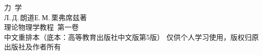 \documentclass[11pt,a4paper,twoside,openright]{ctexbook}
\numberwithin{equation}{section}
\begin{document}
\begin{titlepage}
\thispagestyle{empty}
\centering
\vspace*{3.2cm}
{\heiti 力\ 学}\\[1.2em]
{\kaishu Л.\,Д.\,朗道\quad Е.\,М.\,栗弗席兹\quad 著}\\[3em]
{\kaishu 理论物理学教程\ 第一卷}\\[2em]
{\kaishu 中文重排本（底本：高等教育出版社中文版第5版）}
\vfill
{\kaishu 仅供个人学习使用，版权归原出版社及作者所有}
\end{titlepage}

{\hypersetup{linktoc=all}\tableofcontents}
\clearpage








\end{document}
